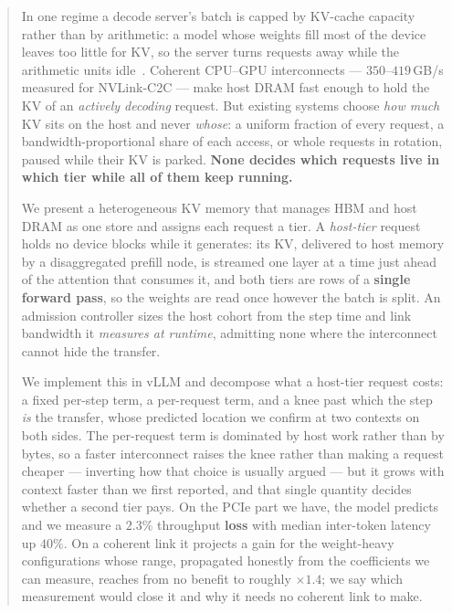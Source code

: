 \begin{abstract}
In one regime a decode server's batch is capped by KV-cache capacity rather than
by arithmetic: a model whose weights fill most of the device leaves too little for
KV, so the server turns requests away while the arithmetic units
idle~\cite{bottlenecks}. Coherent CPU--GPU
interconnects --- $350$--$419$\,GB/s measured for NVLink-C2C --- make host DRAM fast
enough to hold the KV of an \emph{actively decoding} request. But existing systems
choose \emph{how much} KV sits on the host and never \emph{whose}: a uniform
fraction of every request, a bandwidth-proportional share of each access, or whole
requests in rotation, paused while their KV is parked. \textbf{None decides which
requests live in which tier while all of them keep running.}

We present a heterogeneous KV memory that manages HBM and host DRAM as one store and
assigns each request a tier. A \emph{host-tier} request holds no device blocks while
it generates: its KV, delivered to host memory by a disaggregated prefill node, is
streamed one layer at a time just ahead of the attention that consumes it, and both
tiers are rows of a \textbf{single forward pass}, so the weights are read once
however the batch is split. An admission controller sizes the
host cohort from the step time and link bandwidth it \emph{measures at runtime},
admitting none where the interconnect cannot hide the transfer.

We implement this in vLLM and decompose what a host-tier request costs: a fixed
per-step term, a per-request term, and a knee past which the step \emph{is} the
transfer, whose predicted location we confirm at two contexts on both sides. The
per-request term is dominated by host work rather than by bytes, so a faster
interconnect raises the knee rather than making a request cheaper --- inverting how
that choice is usually argued --- but it grows with context faster than we first
reported, and that single quantity decides whether a second tier pays. On the PCIe
part we have, the model predicts and we measure a $2.3\%$ throughput \textbf{loss}
with median inter-token latency up $40\%$. On a coherent link it projects a gain for
the weight-heavy configurations whose range, propagated honestly from the
coefficients we can measure, reaches from no benefit to roughly $\times1.4$; we say
which measurement would close it and why it needs no coherent link to make.
\end{abstract}
